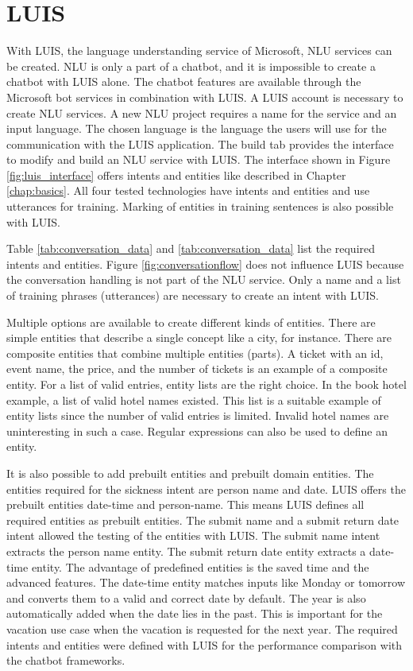 \section{LUIS}
With LUIS\cite{luisdocs}, the language understanding service of Microsoft, NLU services can be created.
NLU is only a part of a chatbot, and it is impossible to create a chatbot with LUIS alone.
The chatbot features are available through the Microsoft bot services 
in combination with LUIS.
A LUIS account is necessary to create NLU services.
A new NLU project requires a name for the service and an input language.
The chosen language is the language the users will use for the communication with the LUIS application.
The build tab provides the interface to modify and build an NLU service with LUIS.
The interface shown in Figure \ref{fig:luis_interface} offers intents and entities like described in Chapter \ref{chap:basics}.
All four tested technologies have intents and entities and use utterances for training.
Marking of entities in training sentences is also possible with LUIS.

Table \ref{tab:conversation_data} and \ref{tab:conversation_data} list the required intents and entities.
Figure \ref{fig:conversationflow} does not influence LUIS because the 
conversation handling is not part of the NLU service.
Only a name and a list of training phrases (utterances) are necessary to create an intent with LUIS.

Multiple options are available to create different kinds of entities.
There are simple entities that describe a single concept like a city, for instance.
There are composite entities that combine multiple entities (parts).
A ticket with an id, event name, the price, and the number of tickets is an example of a composite entity.
For a list of valid entries, entity lists are the right choice.
In the book hotel example, a list of valid hotel names existed.
This list is a suitable example of entity lists since the number of valid entries is limited. 
Invalid hotel names are uninteresting in such a case.
Regular expressions\cite{regex} can also be used to define an entity.

It is also possible to add prebuilt entities and prebuilt domain entities.
The entities required for the sickness intent are person name and date. 
LUIS offers the prebuilt entities date-time and person-name.
This means LUIS defines all required entities as prebuilt entities.
The submit name and a submit return date intent allowed the testing of the entities with LUIS.
The submit name intent extracts the person name entity.
The submit return date entity extracts a date-time entity.
The advantage of predefined entities is the saved time and the 
advanced features.
The date-time entity matches inputs like Monday or tomorrow and converts them to a valid and correct date by default.
The year is also automatically added when the date lies in the past.
This is important for the vacation use case when the vacation is requested for the next year.
The required intents and entities were defined with LUIS for the performance comparison with the chatbot frameworks.
